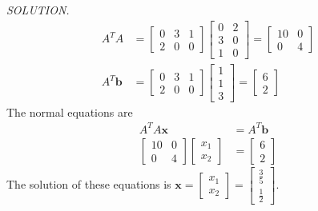 \documentclass{article}
\newcommand\B{\textbf}
\newcommand\T{\textit}
\begin{document}
    \T{\textcolor{blue5}{SOLUTION.}} 
    \begin{equation*}
        \begin{split}
            A^TA &= \begin{bmatrix}
                0 & 3 & 1 \\
                2 & 0 & 0
            \end{bmatrix}
            \begin{bmatrix}
                0 & 2\\
                3& 0 \\
                1  & 0
            \end{bmatrix} =
            \begin{bmatrix}
                10 & 0 \\
                0 & 4
            \end{bmatrix} \\
                A^T\B{b} &= \begin{bmatrix}
                    0 & 3 & 1 \\
                    2 & 0 & 0
                \end{bmatrix} 
                \begin{bmatrix}
                    1 \\ 1 \\ 3
                \end{bmatrix} = \begin{bmatrix}
                    6 \\ 2
                \end{bmatrix}
        \end{split}
    \end{equation*}
    The normal equations are
    \begin{equation*}
        \begin{split}
            A^TA\B{x} &= A^T\B{b} \\
            \begin{bmatrix}
                10 & 0 \\
                0 & 4
            \end{bmatrix} 
            \begin{bmatrix}
                x_1 \\
                x_2
            \end{bmatrix} &=
            \begin{bmatrix}
                6 \\
                2
            \end{bmatrix}
        \end{split}
    \end{equation*}
    The solution of these equations is $\B{x} = \begin{bmatrix}
        x_1 \\
        x_2
    \end{bmatrix} = \begin{bmatrix}
        \frac{3}{5} \\
        \frac{1}{2}
    \end{bmatrix}$.
\end{document}
